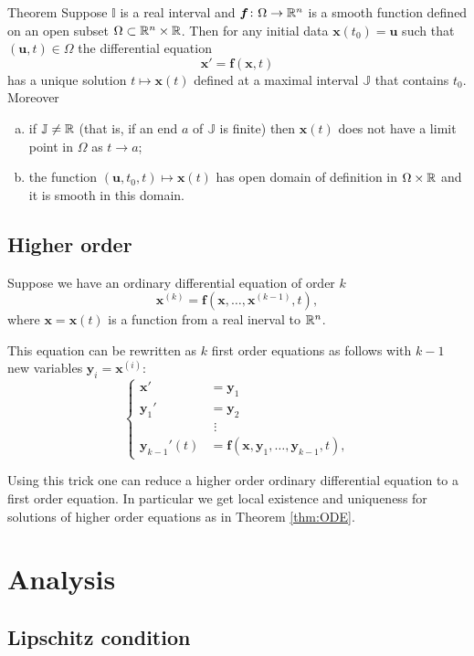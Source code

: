 \begin{thm}{Theorem}\label{thm:ODE}
Suppose $\mathbb{I}$ is a real interval and $\bm{f}\colon\Omega\to \mathbb{R}^n$ is a smooth function defined on an open subset $\Omega\subset \mathbb{R}^n\times \mathbb{R}$.
Then for any initial data $\bm{x}(t_0)=\bm{u}$ such that $(\bm{u},t)\in\Omega$ the differential equation 
\[\bm{x}'=\bm{f}(\bm{x},t)\]
has a unique solution $t\mapsto \bm{x}(t)$ defined at a maximal interval $\mathbb{J}$ that contains $t_0$.
Moreover
\begin{enumerate}[(a)]
\item  if $\mathbb{J}\ne \mathbb{R}$ (that is, if an end $a$ of $\mathbb{J}$ is finite) then $\bm{x}(t)$ does not have a limit point in $\Omega$ as $t\to a$;
\item  the function $(\bm{u},t_0,t)\mapsto \bm{x}(t)$ has open domain of definition in $\Omega\times \mathbb{R}$ and it is smooth in this domain.
\end{enumerate}

\end{thm}

\subsection*{Higher order}

Suppose we have an ordinary differential equation of order $k$
\[\bm{x}^{(k)}=\bm{f}(\bm{x},\dots,\bm{x}^{(k-1)},t),\]
where $\bm{x}=\bm{x}(t)$ is a function from a real inerval to $\mathbb{R}^n$.

This equation can be rewritten as $k$ first order equations as follows with $k-1$ new variables $\bm{y}_i=\bm{x}^{(i)}$:
\[
\begin{cases}
\bm{x}'&=\bm{y}_1
\\
\bm{y}_1'&=\bm{y}_2
\\
&\,\,\vdots
\\
\bm{y}_{k-1}'(t)&=\bm{f}(\bm{x},\bm{y}_{1},\dots,\bm{y}_{k-1},t),
\end{cases}
\]

Using this trick one can reduce a higher order ordinary differential equation to a first order equation. 
In particular we get local existence and uniqueness for solutions of higher order equations as in Theorem \ref{thm:ODE}.

\section{Analysis}

\subsection*{Lipschitz condition}

